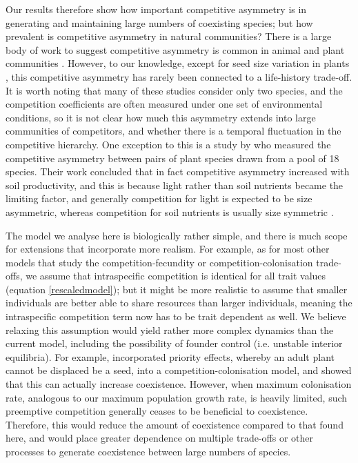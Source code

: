 Our results therefore show how important competitive asymmetry is in generating and maintaining large numbers of coexisting species; but how prevalent is competitive asymmetry in natural communities? There is a large body of work to suggest competitive asymmetry is common in animal \citep[e.g.][]{lawton1981asymmetrical, morin1988experimental,  resetarits1995competitive, costanzo2005asymmetrical} and plant communities \citep[e.g.][]{weiner1990asymmetric, connolly1996asymmetric, keddy1997experimental}. However, to our knowledge, except for seed size variation in plants \citep[e.g.][]{turnbull1999seed}, this competitive asymmetry has rarely been connected to a life-history trade-off. It is worth noting that many of these studies consider only two species, and the competition coefficients are often measured under one set of environmental conditions, so it is not clear how much this asymmetry extends into large communities of competitors, and whether there is a temporal fluctuation in the competitive hierarchy. One exception to this is a study by \cite{keddy1997experimental} who measured the competitive asymmetry between pairs of plant species drawn from a pool of 18 species. Their work concluded that in fact competitive asymmetry increased with soil productivity, and this is because light rather than soil nutrients became the limiting factor, and generally competition for light is expected to be size asymmetric, whereas competition for soil nutrients is usually size symmetric \citep[e.g.][]{weiner1990asymmetric}. 

The model we analyse here is biologically rather simple, and there is much scope for extensions that incorporate more realism. For example, as for most other models that study the competition-fecundity or competition-colonisation trade-offs, we assume that intraspecific competition is identical for all trait values (equation \eqref{rescaledmodel}); but it might be more realistic to assume that smaller individuals are better able to share resources than larger individuals, meaning the intraspecific competition term now has to be trait dependent as well.  We believe relaxing this assumption would yield rather more complex dynamics than the current model, including the possibility of founder control (i.e. unstable interior equilibria). For example,  \cite{calcagno2006coexistence} incorporated priority effects, whereby an adult plant cannot be displaced be a seed, into a competition-colonisation model, and showed that this can actually increase coexistence. However, when maximum colonisation rate, analogous to our maximum population growth rate, is heavily limited, such preemptive competition generally ceases to be beneficial to coexistence. Therefore,  this would reduce the amount of coexistence compared to that found here, and would place greater dependence on multiple trade-offs or other processes to generate coexistence between large numbers of species. 


